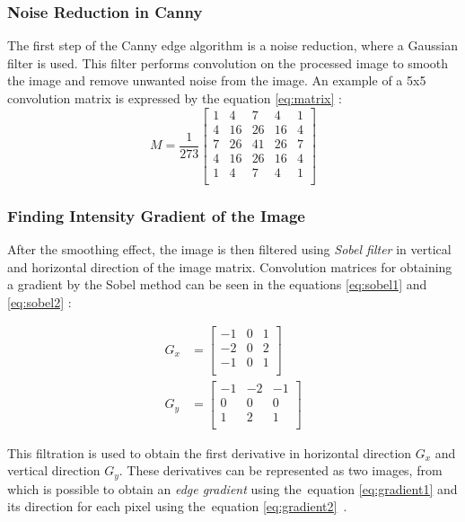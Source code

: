 \subsubsection{Noise Reduction in Canny}
The first step of the Canny edge algorithm is a noise reduction, where a Gaussian filter is used. This filter performs convolution on the processed image to smooth the image and remove unwanted noise from the image. An example of a 5x5 convolution matrix is expressed by the equation \ref{eq:matrix} \cite{gaussian-kernel, canny-opencv}:
\begin{equation}\label{eq:matrix}
M = \frac{1}{273}
\begin{bmatrix}
    1 & 4 & 7 & 4 & 1\\
    4 & 16 & 26 & 16 & 4\\
    7 & 26 & 41 & 26 & 7\\
    4 & 16 & 26 & 16 & 4\\
    1 & 4 & 7 & 4 & 1\\
\end{bmatrix}
\end{equation}
\subsubsection{Finding Intensity Gradient of the Image}
After the smoothing effect, the image is then filtered using \textit{Sobel filter} in vertical and horizontal direction of the image matrix. Convolution matrices for obtaining a gradient by the Sobel method can be seen in the equations \ref{eq:sobel1} and \ref{eq:sobel2} \cite{sobel-matrix-opencv}:


\begin{align}
\label{eq:sobel1}
G_x &=
\begin{bmatrix}
    -1 & 0 & 1\\
    -2 & 0 & 2\\
    -1 & 0 & 1\\
\end{bmatrix}\\
\label{eq:sobel2}
G_y &=
\begin{bmatrix}
    -1 & -2 & -1\\
    0 & 0 & 0\\
    1 & 2 & 1\\
\end{bmatrix}
\end{align}

This filtration is used to obtain the first derivative in horizontal direction \(G_x\) and vertical direction \(G_y\). These derivatives can be represented as two images, from which is possible to obtain an \textit{edge gradient} using the~equation \ref{eq:gradient1} and its direction for each pixel using the~equation \ref{eq:gradient2}~\cite{canny-opencv}.

